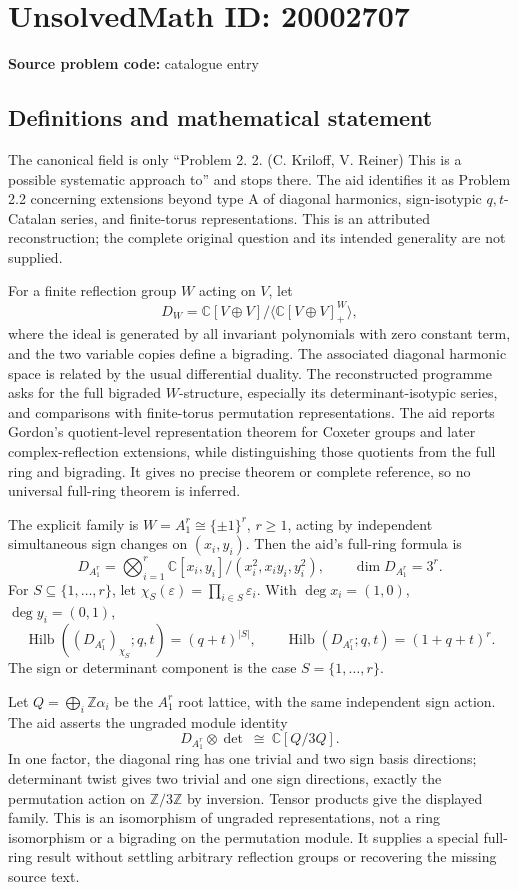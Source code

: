\documentclass[11pt]{article}
\newcommand{\Z}{\mathbb{Z}}
\newcommand{\C}{\mathbb{C}}
\begin{document}
\section*{UnsolvedMath ID: 20002707}
\textbf{Source problem code:} catalogue entry
\subsection{Definitions and mathematical statement}
The canonical field is only ``Problem 2. 2. (C. Kriloff, V. Reiner) This is a possible systematic approach to'' and stops there. The aid identifies it as Problem 2.2 concerning extensions beyond type A of diagonal harmonics, sign-isotypic \(q,t\)-Catalan series, and finite-torus representations. This is an attributed reconstruction; the complete original question and its intended generality are not supplied.

For a finite reflection group \(W\) acting on \(V\), let
\[
 D_W=\C[V\oplus V]\big/\langle\C[V\oplus V]^W_+\rangle,
\]
where the ideal is generated by all invariant polynomials with zero constant term, and the two variable copies define a bigrading. The associated diagonal harmonic space is related by the usual differential duality. The reconstructed programme asks for the full bigraded \(W\)-structure, especially its determinant-isotypic series, and comparisons with finite-torus permutation representations. The aid reports Gordon's quotient-level representation theorem for Coxeter groups and later complex-reflection extensions, while distinguishing those quotients from the full ring and bigrading. It gives no precise theorem or complete reference, so no universal full-ring theorem is inferred.

The explicit family is \(W=A_1^r\cong\{\pm1\}^r\), \(r\ge1\), acting by independent simultaneous sign changes on \((x_i,y_i)\). Then the aid's full-ring formula is
\[
 D_{A_1^r}=\bigotimes_{i=1}^r
 \C[x_i,y_i]/(x_i^2,x_iy_i,y_i^2),
 \qquad\dim D_{A_1^r}=3^r.
\]
For \(S\subseteq\{1,\ldots,r\}\), let \(\chi_S(\varepsilon)=\prod_{i\in S}\varepsilon_i\). With \(\deg x_i=(1,0)\), \(\deg y_i=(0,1)\),
\[
 \operatorname{Hilb}((D_{A_1^r})_{\chi_S};q,t)=(q+t)^{|S|},
 \qquad\operatorname{Hilb}(D_{A_1^r};q,t)=(1+q+t)^r.
\]
The sign or determinant component is the case \(S=\{1,\ldots,r\}\).

Let \(Q=\bigoplus_i\Z\alpha_i\) be the \(A_1^r\) root lattice, with the same independent sign action. The aid asserts the ungraded module identity
\[
 D_{A_1^r}\otimes\det\ \cong\ \C[Q/3Q].
\]
In one factor, the diagonal ring has one trivial and two sign basis directions; determinant twist gives two trivial and one sign directions, exactly the permutation action on \(\Z/3\Z\) by inversion. Tensor products give the displayed family. This is an isomorphism of ungraded representations, not a ring isomorphism or a bigrading on the permutation module. It supplies a special full-ring result without settling arbitrary reflection groups or recovering the missing source text.
\end{document}

